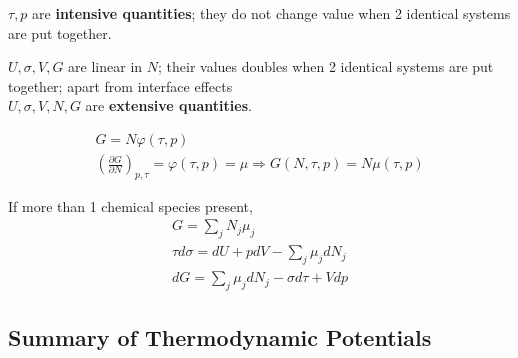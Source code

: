 $\tau,p$ are \textbf{intensive quantities}; they do not change value when 2 identical systems are put together.  

$U,\sigma,V,G$ are linear in $N$; their values doubles when 2 identical systems are put together; apart from interface effects \\
$U,\sigma,V,N,G$ are \textbf{extensive quantities}.  


\[
\begin{gathered}
G = N\varphi(\tau,p) \\
\left( \frac{ \partial G}{ \partial N} \right)_{p,\tau} = \varphi(\tau,p) = \mu \Longrightarrow G(N,\tau,p) = N\mu(\tau,p)
\end{gathered}
\]

If more than 1 chemical species present, 
\begin{equation}\label{Eq:Gibbspotential}
  \boxed{ 
    \begin{gathered}
      G = \sum_j N_j \mu_j  \\
      \tau d\sigma = dU + pdV - \sum_j \mu_j dN_j \\
      dG = \sum_j \mu_j dN_j - \sigma d\tau + Vdp 
      \end{gathered}
    }
\end{equation}


\subsection{Summary of Thermodynamic Potentials}

